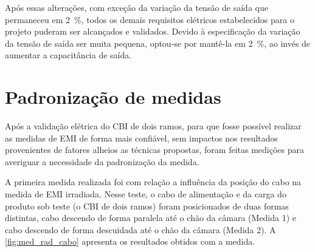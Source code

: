     
    
    Após essas alterações, com exceção da variação da tensão de saída que permaneceu em \SI{2}{\%}, todos os demais requisitos elétricos estabelecidos para o projeto puderam ser alcançados e validados. Devido à especificação da variação da tensão de saída ser muita pequena, optou-se por mantê-la em \SI{2}{\%}, ao invés de aumentar a capacitância de saída.
    
    \section{Padronização de medidas} \label{cap:result_padrao}
    
    Após a validação elétrica do CBI de dois ramos, para que fosse possível realizar as medidas de EMI de forma mais confiável, sem impactos nos resultados provenientes de fatores alheios as técnicas propostas, foram feitas medições para averiguar a necessidade da padronização da medida.  
    
    A primeira medida realizada foi com relação a influência da posição do cabo na medida de EMI irradiada. Nesse teste, o cabo de alimentação e da carga do produto sob teste (o CBI de dois ramos) foram posicionados de duas formas distintas, cabo descendo de forma paralela até o chão da câmara (Medida 1) e cabo descendo de forma descuidada até o chão da câmara (Medida 2). A \autoref{fig:med_rad_cabo} apresenta os resultados obtidos com a medida. 
    
